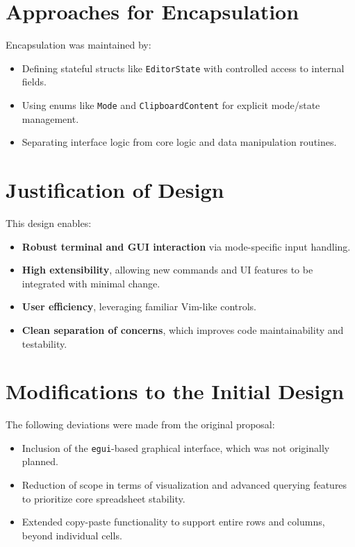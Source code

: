 \documentclass{article}
\begin{document}
\section{Approaches for Encapsulation}

Encapsulation was maintained by:
\begin{itemize}
  \item Defining stateful structs like \texttt{EditorState} with controlled access to internal fields.
  \item Using enums like \texttt{Mode} and \texttt{ClipboardContent} for explicit mode/state management.
  \item Separating interface logic from core logic and data manipulation routines.
\end{itemize}

\section{Justification of Design}

This design enables:
\begin{itemize}
  \item \textbf{Robust terminal and GUI interaction} via mode-specific input handling.
  \item \textbf{High extensibility}, allowing new commands and UI features to be integrated with minimal change.
  \item \textbf{User efficiency}, leveraging familiar Vim-like controls.
  \item \textbf{Clean separation of concerns}, which improves code maintainability and testability.
\end{itemize}

\section{Modifications to the Initial Design}

The following deviations were made from the original proposal:
\begin{itemize}
  \item Inclusion of the \texttt{egui}-based graphical interface, which was not originally planned.
  \item Reduction of scope in terms of visualization and advanced querying features to prioritize core spreadsheet stability.
  \item Extended copy-paste functionality to support entire rows and columns, beyond individual cells.
\end{itemize}
\end{document}
